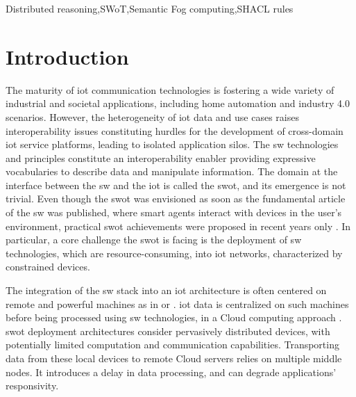 \documentclass{iosart2c}
\begin{document}
\begin{frontmatter}
\begin{keyword}
	Distributed reasoning\sep SWoT\sep Semantic Fog computing\sep SHACL rules
\end{keyword}
	
\end{frontmatter}

\section{Introduction}

The maturity of \gls{iot} communication technologies is fostering a wide variety of industrial and societal applications, including home automation and industry 4.0 scenarios. 
However, the heterogeneity of \gls{iot} data and use cases raises interoperability issues constituting hurdles for the development of cross-domain \gls{iot} service platforms, leading to isolated application silos. 
The \gls{sw} technologies and principles constitute an interoperability enabler providing expressive vocabularies to describe data and manipulate information.
The domain at the interface between the \gls{sw} and the \gls{iot} is called the \gls{swot}, and its emergence is not trivial. 
Even though the \gls{swot} was envisioned as soon as the fundamental article of the \gls{sw} \cite{Berners-Lee2001} was published, where smart agents interact with devices in the user's environment, practical \gls{swot} achievements were proposed in recent years only \cite{Pfisterer2011}.
In particular, a core challenge the \gls{swot} is facing is the deployment of \gls{sw} technologies, which are resource-consuming, into \gls{iot} networks, characterized by constrained devices. 

The integration of the \gls{sw} stack into an \gls{iot} architecture is often centered on remote and powerful machines as in \cite{Gyrard2017} or \cite{Wang2018}. 
\gls{iot} data is centralized on such machines before being processed using \gls{sw} technologies, in a Cloud computing approach \cite{Mell2011}.
\gls{swot} deployment architectures consider pervasively distributed devices, with potentially limited computation and communication capabilities. 
Transporting data from these local devices to remote Cloud servers relies on multiple middle nodes.
It introduces a delay in data processing, and can degrade applications' responsivity.
\end{document}

